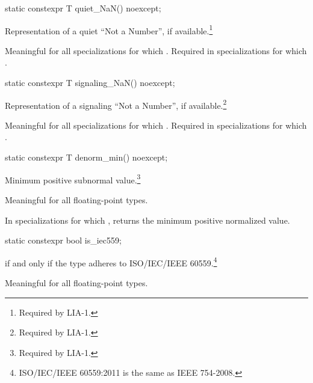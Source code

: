 %
\begin{itemdecl}
static constexpr T quiet_NaN() noexcept;
\end{itemdecl}

\begin{itemdescr}
\pnum
Representation of a quiet ``Not a Number'', if available.\footnote{Required by LIA-1.}

\pnum
Meaningful for all specializations for which
.
Required in specializations for which
.
\end{itemdescr}

%
\begin{itemdecl}
static constexpr T signaling_NaN() noexcept;
\end{itemdecl}

\begin{itemdescr}
\pnum
Representation of a signaling ``Not a Number'', if available.\footnote{Required by LIA-1.}

\pnum
Meaningful for all specializations for which
.
Required in specializations for which
.
\end{itemdescr}

%
\begin{itemdecl}
static constexpr T denorm_min() noexcept;
\end{itemdecl}

\begin{itemdescr}
%
\pnum
Minimum positive subnormal value.\footnote{Required by LIA-1.}

\pnum
Meaningful for all floating-point types.

\pnum
In specializations for which
,
returns the minimum positive normalized value.
\end{itemdescr}

%
\begin{itemdecl}
static constexpr bool is_iec559;
\end{itemdecl}

\begin{itemdescr}
\pnum
{} if and only if the type adheres to ISO/IEC/IEEE
60559.\footnote{ISO/IEC/IEEE 60559:2011 is the same as IEEE 754-2008.}

\pnum
Meaningful for all floating-point types.
\end{itemdescr}

